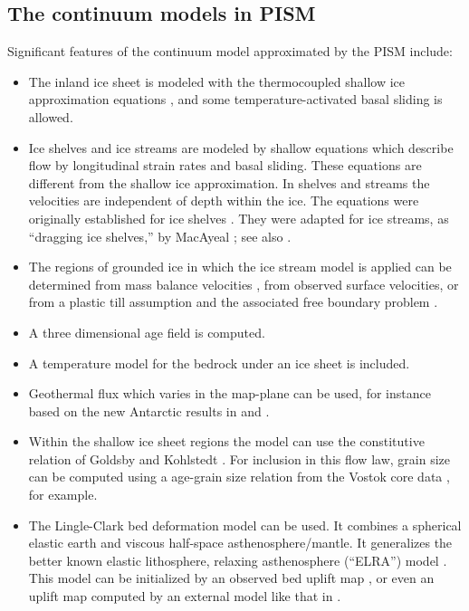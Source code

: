 \documentclass[11pt,final]{amsart}
\begin{document}
\subsection{The continuum models in PISM}  Significant features of the continuum model approximated by the PISM include:\begin{itemize}
\item The inland ice sheet is modeled with the thermocoupled shallow ice approximation equations \cite{Fowler}, and some temperature-activated basal sliding is allowed.
\item Ice shelves and ice streams are modeled by shallow equations which describe flow by longitudinal strain rates and basal sliding.  These equations are different from the shallow ice approximation.  In shelves and streams the velocities are independent of depth within the ice.  The equations were originally established for ice shelves \cite{Morland,MorlandZainuddin,MacAyealetal}.  They were adapted for ice streams, as ``dragging ice shelves,'' by MacAyeal \cite{MacAyeal}; see also \cite{HulbeMacAyeal}.
\item The regions of grounded ice in which the ice stream model is applied can be determined from mass balance velocities \cite{BamberVaughanJoughin}, from observed surface velocities, or from a plastic till assumption and the associated free boundary problem \cite{SchoofStream}.
\item A three dimensional age field is computed.
\item A temperature model for the bedrock under an ice sheet is included.
\item Geothermal flux which varies in the map-plane can be used, for instance based on the new Antarctic results in \cite{ShapiroRitzwoller} and \cite{FoxMaule}.
\item Within the shallow ice sheet regions the model can use the constitutive relation of Goldsby and Kohlstedt \cite{GoldsbyKohlstedt,Peltieretal}.  For inclusion in this flow law, grain size can be computed using a age-grain size relation from the Vostok core data \cite{VostokCore}, for example.
\item The Lingle-Clark \cite{BLKfastearth,LingleClark} bed deformation model can be used.  It combines a spherical elastic earth and viscous half-space asthenosphere/mantle.  It generalizes the better known elastic lithosphere, relaxing asthenosphere (``ELRA'') model \cite{Greve2001}.  This model can be initialized by an observed bed uplift map \cite{BLKfastearth}, or even an uplift map computed by an external model like that in \cite{IvinsJames2005}.\end{itemize}
\end{document}
